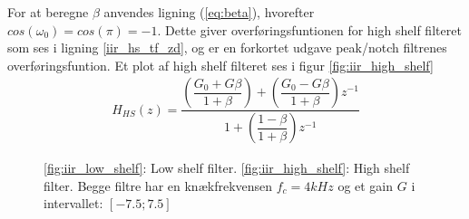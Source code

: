 

     For at beregne $\beta$ anvendes ligning (\ref{eq:beta}), hvorefter $cos(\omega_0) = cos(\pi) = -1$. Dette giver overføringsfuntionen for high shelf filteret som ses i ligning \ref{iir_hs_tf_zd}, og er en forkortet udgave peak/notch filtrenes overføringsfuntion. Et plot af high shelf filteret ses i figur \ref{fig:iir_high_shelf}
     \begin{align}
     H_{HS}(z) =     \dfrac{\left(\dfrac{G_0 + G \beta}{1 + \beta} \right) + \left(\dfrac{ G_0 - G \beta}{1 + \beta }\right) z^{-1}}{1  + \left( \dfrac{1 - \beta}{1 + \beta} \right) z^{-1}} \label{iir_hs_tf_z}
     \end{align}
%
%


\begin{figure}[h]
	\centering
	\caption{\ref{fig:iir_low_shelf}: Low shelf filter. \hspace{4cm} \ref{fig:iir_high_shelf}: High shelf filter. \newline Begge filtre har en knækfrekvensen $f_c = 4kHz$ og et gain $G$ i intervallet: $[-7.5 ; 7.5]$}
\end{figure}
\FloatBlock

